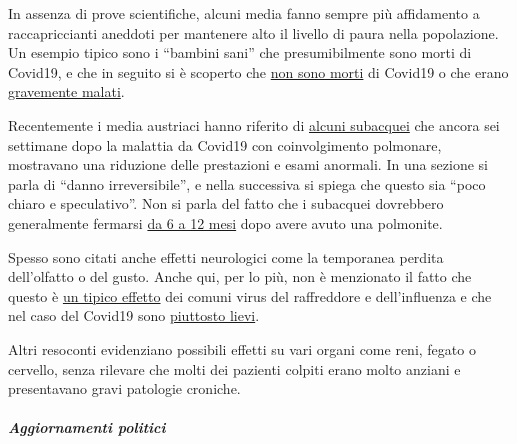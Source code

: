 In assenza di prove scientifiche, alcuni media fanno sempre più
affidamento a raccapriccianti aneddoti per mantenere alto il livello di
paura nella popolazione. Un esempio tipico sono i ``bambini sani'' che
presumibilmente sono morti di Covid19, e che in seguito si è scoperto
che
\href{https://www.dailymail.co.uk/news/article-8193487/Coroner-refuses-rule-COVID-19-cause-death-six-week-old-Connecticut-baby.html}{non
sono morti} di Covid19 o che erano
\href{https://www.msn.com/de-ch/news/other/spanischer-nachwuchs-trainer-stirbt-an-corona/ar-BB11gT64}{gravemente
malati}.

Recentemente i media austriaci hanno riferito di
\href{https://www.rainews.it/tgr/tagesschau/articoli/2020/04/tag-Coronavirus-Lungeschaden-Forschung-Uniklinik-Innsbruck-6708e11e-28dc-4843-a760-e7f926ace61c.html}{alcuni
subacquei} che ancora sei settimane dopo la malattia da Covid19 con
coinvolgimento polmonare, mostravano una riduzione delle prestazioni e
esami anormali. In una sezione si parla di ``danno irreversibile'', e
nella successiva si spiega che questo sia ``poco chiaro e speculativo''.
Non si parla del fatto che i subacquei dovrebbero generalmente fermarsi
\href{https://www.deeperblue.com/pulmonary-considerations-in-diving/}{da
6 a 12 mesi} dopo avere avuto una polmonite.

Spesso sono citati anche effetti neurologici come la temporanea perdita
dell'olfatto o del gusto. Anche qui, per lo più, non è menzionato il
fatto che questo è
\href{https://www.ncbi.nlm.nih.gov/pubmed/25294743}{un tipico effetto}
dei comuni virus del raffreddore e dell'influenza e che nel caso del
Covid19 sono
\href{https://www.ncbi.nlm.nih.gov/pubmed/23948436}{piuttosto lievi}.

Altri resoconti evidenziano possibili effetti su vari organi come reni,
fegato o cervello, senza rilevare che molti dei pazienti colpiti erano
molto anziani e presentavano gravi patologie croniche.

\hypertarget{aggiornamenti-politici-1}{%
\subparagraph{\texorpdfstring{\textbf{Aggiornamenti
politici}}{Aggiornamenti politici}}\label{aggiornamenti-politici-1}}

